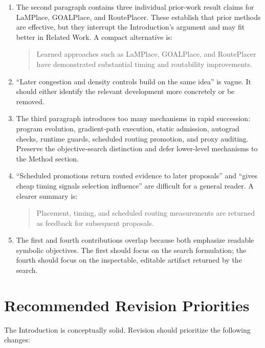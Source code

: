 \documentclass[11pt]{article}
\begin{document}
\begin{enumerate}
  \item The second paragraph contains three individual prior-work result claims
  for LaMPlace, GOALPlace, and RoutePlacer. These establish that prior methods
  are effective, but they interrupt the Introduction's argument and may fit
  better in Related Work. A compact alternative is:

  \begin{quote}
  Learned approaches such as LaMPlace, GOALPlace, and RoutePlacer have
  demonstrated substantial timing and routability improvements.
  \end{quote}

  \item ``Later congestion and density controls build on the same idea'' is
  vague. It should either identify the relevant development more concretely or
  be removed.

  \item The third paragraph introduces too many mechanisms in rapid succession:
  program evolution, gradient-path execution, static admission, autograd
  checks, runtime guards, scheduled routing promotion, and proxy auditing.
  Preserve the objective-search distinction and defer lower-level mechanisms
  to the Method section.

  \item ``Scheduled promotions return routed evidence to later proposals'' and
  ``gives cheap timing signals selection influence'' are difficult for a
  general reader. A clearer summary is:

  \begin{quote}
  Placement, timing, and scheduled routing measurements are returned as
  feedback for subsequent proposals.
  \end{quote}

  \item The first and fourth contributions overlap because both emphasize
  readable symbolic objectives. The first should focus on the search
  formulation; the fourth should focus on the inspectable, editable artifact
  returned by the search.
\end{enumerate}

\section{Recommended Revision Priorities}

The Introduction is conceptually solid. Revision should prioritize the
following changes:
\end{document}
